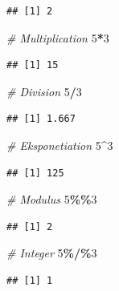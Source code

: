 \documentclass[
]{book}
\newenvironment{Shaded}{\begin{snugshade}}{\end{snugshade}}
\newcommand{\CommentTok}[1]{\textcolor[rgb]{0.56,0.35,0.01}{\textit{#1}}}
\newcommand{\DecValTok}[1]{\textcolor[rgb]{0.00,0.00,0.81}{#1}}
\newcommand{\SpecialCharTok}[1]{\textcolor[rgb]{0.81,0.36,0.00}{\textbf{#1}}}
\theoremstyle{definition}
\theoremstyle{definition}
\theoremstyle{definition}
\theoremstyle{definition}
\theoremstyle{remark}
\begin{document}
\begin{verbatim}
## [1] 2
\end{verbatim}

\begin{Shaded}
\begin{Highlighting}[]
\CommentTok{\# Multiplication}
\DecValTok{5}\SpecialCharTok{*}\DecValTok{3}
\end{Highlighting}
\end{Shaded}

\begin{verbatim}
## [1] 15
\end{verbatim}

\begin{Shaded}
\begin{Highlighting}[]
\CommentTok{\# Division}
\DecValTok{5}\SpecialCharTok{/}\DecValTok{3}
\end{Highlighting}
\end{Shaded}

\begin{verbatim}
## [1] 1.667
\end{verbatim}

\begin{Shaded}
\begin{Highlighting}[]
\CommentTok{\# Eksponetiation}
\DecValTok{5}\SpecialCharTok{\^{}}\DecValTok{3}
\end{Highlighting}
\end{Shaded}

\begin{verbatim}
## [1] 125
\end{verbatim}

\begin{Shaded}
\begin{Highlighting}[]
\CommentTok{\# Modulus}
\DecValTok{5}\SpecialCharTok{\%\%}\DecValTok{3}
\end{Highlighting}
\end{Shaded}

\begin{verbatim}
## [1] 2
\end{verbatim}

\begin{Shaded}
\begin{Highlighting}[]
\CommentTok{\# Integer}
\DecValTok{5}\SpecialCharTok{\%/\%}\DecValTok{3}
\end{Highlighting}
\end{Shaded}

\begin{verbatim}
## [1] 1
\end{verbatim}
\end{document}
